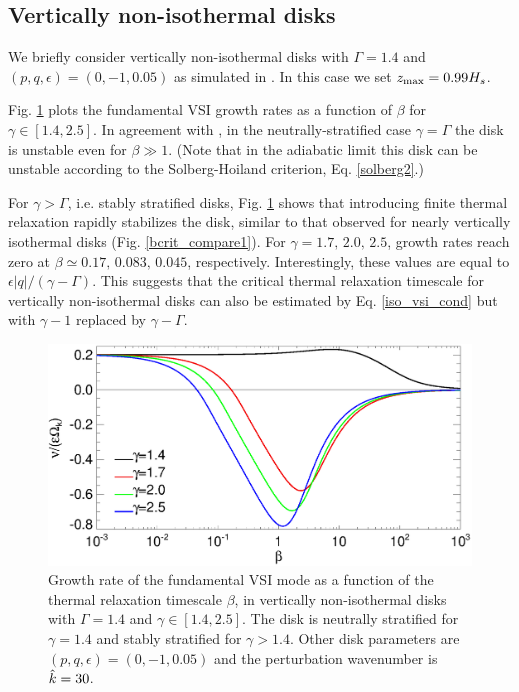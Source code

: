 \subsection{Vertically non-isothermal disks} 
We briefly consider vertically non-isothermal disks with 
$\Gamma=1.4$ and $(p,q,\epsilon)=(0,-1,0.05)$ as simulated in
\cite{nelson13}. In this case we set $z_\mathrm{max}=0.99H_s$.  

Fig. \ref{gcorr_compare_vnoniso} plots the fundamental VSI growth
rates as a function of $\beta$ for $\gamma\in[1.4,2.5]$. In agreement
with \citeauthor{nelson13}, in  
the neutrally-stratified case $\gamma=\Gamma$ the disk is unstable 
even for $\beta\gg 1$. (Note that in the adiabatic limit 
this disk can be unstable according to the
Solberg-Hoiland criterion, Eq. \ref{solberg2}.) 

For $\gamma>\Gamma$, i.e. stably stratified disks,
Fig. \ref{gcorr_compare_vnoniso} shows that introducing finite thermal
relaxation rapidly stabilizes the disk, similar to that observed for
nearly vertically isothermal disks (Fig. \ref{bcrit_compare1}). For
$\gamma=1.7,\,2.0,\,2.5$, growth rates reach zero at
$\beta\simeq0.17,\,0.083,\,0.045$, respectively. Interestingly, these
values are equal to $\epsilon|q|/(\gamma-\Gamma)$. This suggests that
the critical thermal relaxation timescale for vertically
non-isothermal disks can also be estimated by Eq. \ref{iso_vsi_cond}
but with $\gamma-1$ replaced by $\gamma-\Gamma$. 

\begin{figure}
  \includegraphics[width=\linewidth,clip=true,trim=0cm 0cm 0cm
  0cm]{figures/gcorr_compare_vnoniso2}
  \caption{Growth rate of the fundamental VSI mode as a function of
    the thermal relaxation timescale $\beta$, in vertically
    non-isothermal disks with $\Gamma=1.4$ and
    $\gamma\in[1.4,2.5]$. The disk is neutrally
    stratified for $\gamma=1.4$ and stably stratified for
    $\gamma>1.4$. Other disk parameters are
    $(p,q,\epsilon)=(0,-1,0.05)$ and the perturbation wavenumber is
    $\hat{k}=30$.   
    \label{gcorr_compare_vnoniso}}
\end{figure}












